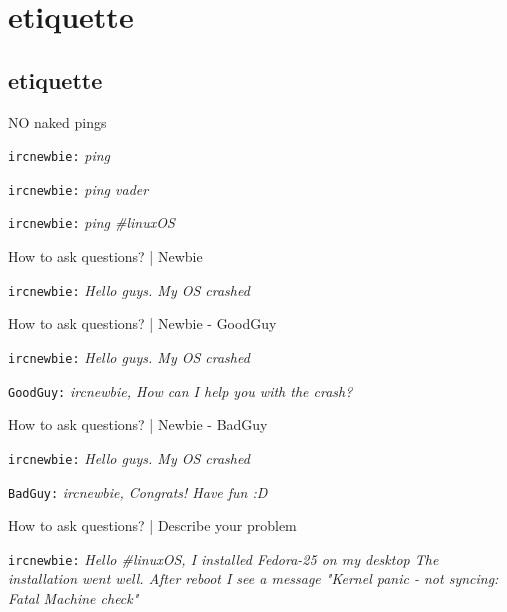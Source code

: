 \documentclass[10pt]{beamer}
\begin{document}
\section{etiquette}
\label{sec:orgeab0c8b}
\subsection{etiquette}
\label{sec:org509ca5c}
\begin{frame}[fragile,label={sec:orgf3d1d8b}]{NO naked pings}
 \begin{block}{}
\texttt{ircnewbie:} \emph{ping}

\texttt{ircnewbie:} \emph{ping vader}

\texttt{ircnewbie:} \emph{ping \#linuxOS}
\end{block}
\end{frame}

\begin{frame}[fragile,label={sec:org5aa331d}]{How to ask questions? | Newbie}
 \begin{block}{}
\texttt{ircnewbie:} \emph{Hello guys. My OS crashed}
\end{block}
\end{frame}


\begin{frame}[fragile,label={sec:org2cb7977}]{How to ask questions? | Newbie - GoodGuy}
 \begin{block}{}
\texttt{ircnewbie:} \emph{Hello guys. My OS crashed}

\texttt{GoodGuy:} \emph{ircnewbie, How can I help you with the crash?}
\end{block}
\end{frame}


\begin{frame}[fragile,label={sec:org3b53d09}]{How to ask questions? | Newbie - BadGuy}
 \begin{block}{}
\texttt{ircnewbie:} \emph{Hello guys. My OS crashed}

\texttt{BadGuy:} \emph{ircnewbie, Congrats! Have fun :D}
\end{block}
\end{frame}

\begin{frame}[fragile,label={sec:org5cab523}]{How to ask questions? | Describe your problem}
 \begin{block}{}
\texttt{ircnewbie:} \emph{Hello \#linuxOS, I installed Fedora-25 on my desktop The installation went well. After reboot I see a message "Kernel
panic - not syncing: Fatal Machine check"}
\end{block}
\end{frame}
\end{document}
